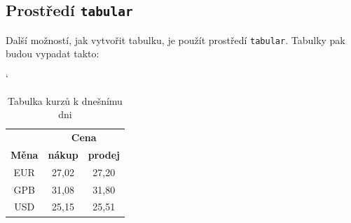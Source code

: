 \documentclass[a4paper, 11pt, times]{article}
\begin{document}
\subsection{Prostředí \texttt{tabular} }
Další možností, jak vytvořit tabulku, je použít prostředí \texttt{tabular}. Tabulky pak
budou vypadat takto\footnotemark[1]:
\begin{table}[h]
\centering
 \catcode`
\begin{tabular}{|c|c|c|}
\hline
 & \multicolumn{2}{c|}{\textbf{Cena}} \\ \cline{2-3}
\textbf{Měna} & \textbf{nákup}  & \textbf{prodej} \\ \hline
EUR               & 27,02           & 27,20  \\
GPB               & 31,08           & 31,80  \\
USD               & 25,15           & 25,51  \\
\hline
\end{tabular}
\caption{Tabulka kurzů k dnešnímu dni}
\label{tab:small_table}
\end{table}
\end{document}
